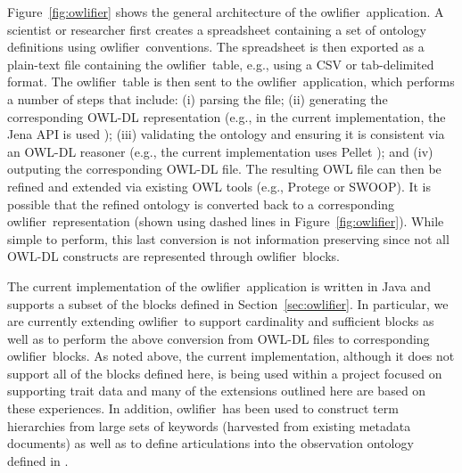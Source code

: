 \documentclass[preprint,number]{elsarticle}
\newcommand{\owlifier}{\textsf{owlifier}}
\newcommand{\secref}[1]{Section~\ref{#1}}
\newcommand{\figref}[1]{Figure~\ref{#1}}
\begin{document}
\figref{fig:owlifier} shows the general architecture of the \owlifier\
application. A scientist or researcher first creates a spreadsheet
containing a set of ontology definitions using \owlifier\ conventions.
The spreadsheet is then exported as a plain-text file containing the
\owlifier\ table, e.g., using a CSV or tab-delimited format. The
\owlifier\ table is then sent to the \owlifier\ application, which
performs a number of steps that include: (i) parsing the file; (ii)
generating the corresponding OWL-DL representation (e.g., in the
current implementation, the Jena API is used \cite{carroll04:_jena});
(iii) validating the ontology and ensuring it is consistent via an
OWL-DL reasoner (e.g., the current implementation uses Pellet
\cite{sirin07:_pellet}); and (iv) outputing the corresponding OWL-DL
file. The resulting OWL file can then be refined and extended via
existing OWL tools (e.g., Protege or SWOOP). It is possible that the
refined ontology is converted back to a corresponding \owlifier\
representation (shown using dashed lines in
\figref{fig:owlifier}). While simple to perform, this last conversion
is not information preserving since not all OWL-DL constructs are
represented through \owlifier\ blocks.

The current implementation of the \owlifier\ application is written in
Java and supports a subset of the blocks defined in
\secref{sec:owlifier}. In particular, we are currently extending
\owlifier\ to support cardinality and sufficient blocks as well as to
perform the above conversion from OWL-DL files to corresponding
\owlifier\ blocks. As noted above, the current implementation,
although it does not support all of the blocks defined here, is being
used within a project focused on supporting trait data and many of the
extensions outlined here are based on these experiences. In addition,
\owlifier\ has been used to construct term hierarchies from large sets
of keywords (harvested from existing metadata documents) as well as to
define articulations into the observation ontology defined in
\cite{madin07:_ontol_for_descr_and_synth}. 
\end{document}
